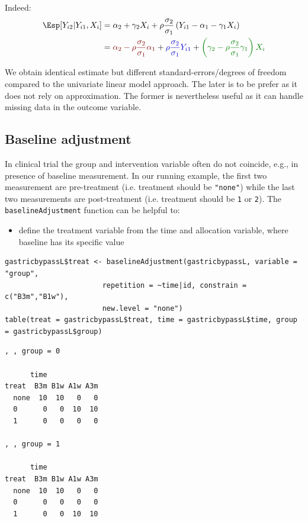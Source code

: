 \documentclass[12pt]{article}
\newcommand{\darkblue}{blue!80!black}
\newcommand{\darkgreen}{green!50!black}
\newcommand{\darkred}{red!50!black}
\begin{document}
Indeed:
\begin{align*}
\Esp[Y_{i2}|Y_{i1},X_{i}] &= \alpha_2 + \gamma_2 X_{i} + \rho \frac{\sigma_2}{\sigma_1}\left(Y_{i1} - \alpha_1 - \gamma_1 X_{i}\right) \\
                         &= \textcolor{\darkred}{\alpha_2 - \rho \frac{\sigma_2}{\sigma_1} \alpha_1}
                         + \textcolor{\darkblue}{\rho \frac{\sigma_2}{\sigma_1}Y_{i1}}
                         + \textcolor{\darkgreen}{\left(\gamma_2 - \rho \frac{\sigma_2}{\sigma_1} \gamma_1\right)  X_{i} }
\end{align*}

We obtain identical estimate but different standard-errors/degrees of
freedom compared to the univariate linear model approach. The later is
to be prefer as it does not rely on approximation. The former is
nevertheless useful as it can handle missing data in the outcome
variable.

\clearpage

\subsection{Baseline adjustment}
\label{sec:org866f5f9}

In clinical trial the group and intervention variable often do not
coincide, e.g., in presence of baseline measurement. In our running
example, the first two measurement are pre-treatment (i.e. treatment
should be \texttt{"none"}) while the last two measurements are post-treatment
(i.e. treatment should be \texttt{1} or \texttt{2}). The \texttt{baselineAdjustment}
function can be helpful to:
\begin{itemize}
\item define the treatment variable from the time and allocation variable, where baseline has its specific value
\end{itemize}
\lstset{language=r,label= ,caption= ,captionpos=b,numbers=none}
\begin{lstlisting}
gastricbypassL$treat <- baselineAdjustment(gastricbypassL, variable = "group",
					   repetition = ~time|id, constrain = c("B3m","B1w"),
					   new.level = "none")
table(treat = gastricbypassL$treat, time = gastricbypassL$time, group = gastricbypassL$group)
\end{lstlisting}

\begin{verbatim}
, , group = 0

      time
treat  B3m B1w A1w A3m
  none  10  10   0   0
  0      0   0  10  10
  1      0   0   0   0

, , group = 1

      time
treat  B3m B1w A1w A3m
  none  10  10   0   0
  0      0   0   0   0
  1      0   0  10  10
\end{verbatim}
\end{document}
